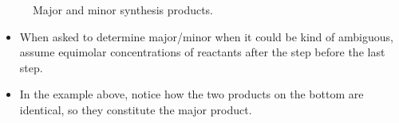 \documentclass[../notes.tex]{subfiles}
\begin{document}
\begin{itemize}
\begin{figure}[H]
        \caption{Major and minor synthesis products.}
        \label{fig:majorMinor}
    \end{figure}
    \begin{itemize}
        \item When asked to determine major/minor when it could be kind of ambiguous, assume equimolar concentrations of reactants after the step before the last step.
        \item In the example above, notice how the two products on the bottom are identical, so they constitute the major product.
    \end{itemize}
\end{itemize}
\end{document}
